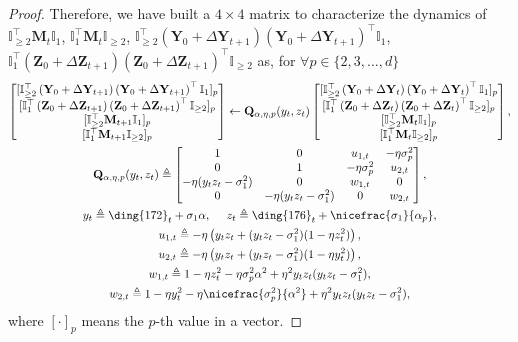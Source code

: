 \documentclass{article}
\theoremstyle{plain}
\theoremstyle{remark}
\def\bY{\mathbf{Y}}
\def\bZ{\mathbf{Z}}
\newcommand{\cc}[1]{\text{\ding{\number\numexpr#1 + 171\relax}}}
\begin{document}
\begin{proof}
    Therefore, we have built a $4\times4$ matrix to characterize the dynamics of $\mathbb{I}_{\ge2}^\top\mathbf{M}_t\mathbb{I}_1$, $\mathbb{I}_{1}^\top\mathbf{M}_t\mathbb{I}_{\ge2}$, $\mathbb{I}_{\ge2}^\top\left(\bY_0+\Delta\bY_{t+1}\right)\left(\bY_0+\Delta\bY_{t+1}\right)^\top\mathbb{I}_{1}$, $\mathbb{I}_{1}^\top\left(\bZ_0+\Delta\bZ_{t+1}\right)\left(\bZ_0+\Delta\bZ_{t+1}\right)^\top\mathbb{I}_{\ge2}$ as, for $\forall p\in\{2,3,\dots,d\}$
    \begin{gather*}
        \begin{bmatrix}
            [\mathbb{I}_{\ge2}^\top\left(\bY_0+\Delta\bY_{t+1}\right)\left(\bY_0+\Delta\bY_{t+1}\right)^\top\mathbb{I}_{1}]_p\\
            [\mathbb{I}_{1}^\top\left(\bZ_0+\Delta\bZ_{t+1}\right)\left(\bZ_0+\Delta\bZ_{t+1}\right)^\top\mathbb{I}_{\ge2}]_p\\
            [\mathbb{I}_{\ge2}^\top\mathbf{M}_{t+1}\mathbb{I}_1]_p \\
            [\mathbb{I}_{1}^\top\mathbf{M}_{t+1}\mathbb{I}_{\ge2}]_p
        \end{bmatrix}
        \leftarrow 
        \mathbf{Q}_{\alpha,\eta,p}(y_t, z_t)
        \begin{bmatrix}
            [\mathbb{I}_{\ge2}^\top\left(\bY_0+\Delta\bY_{t}\right)\left(\bY_0+\Delta\bY_{t}\right)^\top\mathbb{I}_{1}]_p\\
            [\mathbb{I}_{1}^\top\left(\bZ_0+\Delta\bZ_{t}\right)\left(\bZ_0+\Delta\bZ_{t}\right)^\top\mathbb{I}_{\ge2}]_p\\
            [\mathbb{I}_{\ge2}^\top\mathbf{M}_{t}\mathbb{I}_1]_p \\
            [\mathbb{I}_{1}^\top\mathbf{M}_{t}\mathbb{I}_{\ge2}]_p
        \end{bmatrix},\\
        \mathbf{Q}_{\alpha,\eta,p}(y_t, z_t)
        \triangleq
        \begin{bmatrix}
            1 & 0 & u_{1,t} & -\eta\sigma_p^2 \\
            0 & 1 & -\eta\sigma_p^2 & u_{2,t} \\
            -\eta(y_t z_t-\sigma_1^2) & 0 & w_{1,t} & 0 \\
            0 & -\eta(y_t z_t-\sigma_1^2) & 0 & w_{2,t}
        \end{bmatrix},
        \\
        y_t \triangleq \cc{1}_t+\sigma_1\alpha, ~~~~ z_t\triangleq \cc{5}_t+\nicefrac{\sigma_1}{\alpha_p},\\
        u_{1,t}\triangleq -\eta\left( y_t z_t + (y_t z_t-\sigma_1^2)(1-\eta z_t^2) \right),\\
        u_{2,t}\triangleq -\eta\left( y_t z_t + (y_t z_t-\sigma_1^2)(1-\eta y_t^2) \right),\\
        w_{1,t}\triangleq 1-\eta z_t^2-\eta\sigma_p^2\alpha^2+\eta^2 y_t z_t (y_t z_t - \sigma_1^2), \\
        w_{2,t}\triangleq 1-\eta y_t^2-\eta\nicefrac{\sigma_p^2}{\alpha^2}+\eta^2 y_t z_t (y_t z_t - \sigma_1^2),
    \end{gather*}
    where $[\cdot]_p$ means the $p$-th value in a vector.


\end{proof}
\end{document}
